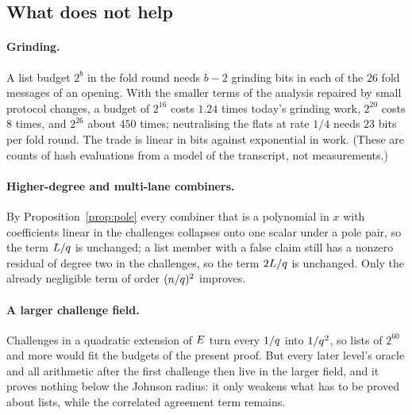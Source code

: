 \subsection{What does not help}\label{sec:nohelp}

\paragraph{Grinding.} A list budget $2^b$ in the fold round needs $b-2$ grinding bits in each of the $26$ fold messages of an opening. With the smaller terms of the analysis repaired by small protocol changes, a budget of $2^{16}$ costs $1.24$ times today's grinding work, $2^{20}$ costs $8$ times, and $2^{26}$ about $450$ times; neutralising the flats at rate $1/4$ needs $23$ bits per fold round. The trade is linear in bits against exponential in work. (These are counts of hash evaluations from a model of the transcript, not measurements.)

\paragraph{Higher-degree and multi-lane combiners.} By Proposition~\ref{prop:pole} every combiner that is a polynomial in $x$ with coefficients linear in the challenges collapses onto one scalar under a pole pair, so the term $L/q$ is unchanged; a list member with a false claim still has a nonzero residual of degree two in the challenges, so the term $2L/q$ is unchanged. Only the already negligible term of order $(n/q)^2$ improves.

\paragraph{A larger challenge field.} Challenges in a quadratic extension of $E$ turn every $1/q$ into $1/q^2$, so lists of $2^{60}$ and more would fit the budgets of the present proof. But every later level's oracle and all arithmetic after the first challenge then live in the larger field, and it proves nothing below the Johnson radius: it only weakens what has to be proved about lists, while the correlated agreement term remains.

